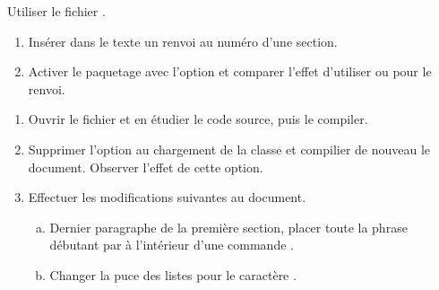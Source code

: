 \begin{exercice}[nosol]
  Utiliser le fichier .
  \begin{enumerate}
  \item Insérer dans le texte un renvoi au numéro d'une section.
  \item Activer le paquetage  avec l'option
     et comparer l'effet d'utiliser \cmd{\ref} ou
    \cmd{\autoref} pour le renvoi.
  \end{enumerate}
\end{exercice}

\begin{exercice}
  \begin{enumerate}
  \item Ouvrir le fichier  et en
    étudier le code source, puis le compiler.
  \item Supprimer l'option  au chargement de la classe
    et compilier de nouveau le document. Observer l'effet de cette
    option.
  \item Effectuer les modifications suivantes au document.
    \begin{enumerate}[a)]
    \item Dernier paragraphe de la première section, placer toute la
      phrase débutant par  à l'intérieur
      d'une commande \cmd{\emph}.
    \item Changer la puce des listes pour le caractère \code{\$>\$}.
    \end{enumerate}
  \end{enumerate}
\end{exercice}

